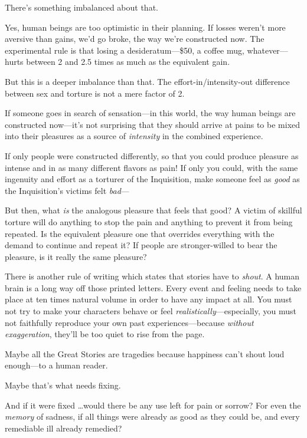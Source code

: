 {
 There's something imbalanced about that.}

{
 Yes, human beings are too optimistic in their planning. If losses
weren't more aversive than gains, we'd
go broke, the way we're constructed now. The
experimental rule is that losing a desideratum---\$50, a coffee mug,
whatever---hurts between 2 and 2.5 times as much as the equivalent
gain.}

{
 But this is a deeper imbalance than that. The
effort-in/intensity-out difference between sex and torture is not a
mere factor of 2.}

{
 If someone goes in search of sensation---in this world, the way
human beings are constructed now---it's not surprising
that they should arrive at pains to be mixed into their pleasures as a
source of \textit{intensity} in the combined experience.}

{
 If only people were constructed differently, so that you could
produce pleasure as intense and in as many different flavors as pain!
If only you could, with the same ingenuity and effort as a torturer of
the Inquisition, make someone feel as \textit{good} as the
Inquisition's victims felt \textit{bad}{}---}

{
 But then, what \textit{is} the analogous pleasure that feels that
good? A victim of skillful torture will do anything to stop the pain
and anything to prevent it from being repeated. Is the equivalent
pleasure one that overrides everything with the demand to continue and
repeat it? If people are stronger-willed to bear the pleasure, is it
really the same pleasure?}

{
 There is another rule of writing which states that stories have to
\textit{shout}. A human brain is a long way off those printed letters.
Every event and feeling needs to take place at ten times natural volume
in order to have any impact at all. You must not try to make your
characters behave or feel \textit{realistically}{}---especially, you
must not faithfully reproduce your own past experiences---because
\textit{without exaggeration}, they'll be too quiet to
rise from the page.}

{
 Maybe all the Great Stories are tragedies because happiness
can't shout loud enough---to a human reader.}

{
 Maybe that's what needs fixing.}

{
 And if it were fixed \ldots would there be any use left for pain or
sorrow? For even the \textit{memory} of sadness, if all things were
already as good as they could be, and every remediable ill already
remedied?}

